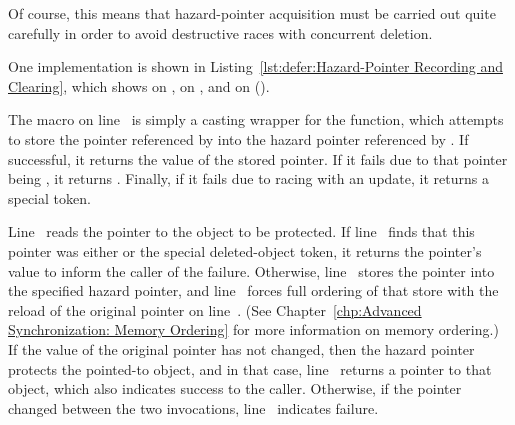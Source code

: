 Of course, this means that hazard-pointer acquisition must be carried
out quite carefully in order to avoid destructive races with concurrent
deletion.
\begin{fcvref}
One implementation is shown in
Listing~\ref{lst:defer:Hazard-Pointer Recording and Clearing},
which shows  on ,
 on , and
 on
 ().

The  macro on line~ is simply a casting
wrapper for the  function, which attempts to store
the pointer referenced by  into the hazard pointer referenced
by .
If successful, it returns the value of the stored pointer.
If it fails due to that pointer being , it returns .
Finally, if it fails due to racing with an update, it returns a special
 token.

\QuickQuizEnd

Line~ reads the pointer to the object to be protected.
If line~ finds that this pointer was either  or
the special  deleted-object token, it returns
the pointer's value to inform the caller of the failure.
Otherwise, line~ stores the pointer into the specified
hazard pointer, and line~ forces full ordering of that
store with the reload of the original pointer on line~.
(See Chapter~\ref{chp:Advanced Synchronization: Memory Ordering}
for more information on memory ordering.)
If the value of the original pointer has not changed, then the hazard
pointer protects the pointed-to object, and in that case,
line~ returns a pointer to that object, which also
indicates success to the caller.
Otherwise, if the pointer changed between the two 
invocations, line~ indicates failure.


\end{fcvref}
